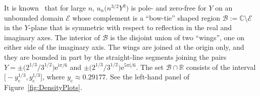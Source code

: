 It is known~\cite[Theorem 3]{BuckinghamM22} that for large $n$, $u_n\bigl(n^{3/2}Y^3\bigr)$ is pole- and zero-free for $Y$ on an unbounded domain $\mathcal{E}$ whose complement is a ``bow-tie'' shaped region $\mathcal{B}:=\mathbb{C}\setminus\mathcal{E}$ in the $Y$-plane that is symmetric with respect to reflection in the real and imaginary axes. The interior of $\mathcal{B}$ is the disjoint union of two ``wings'', one on either side of the imaginary axis. The wings are joined at the origin only, and they are bounded in part by the straight-line segments joining the pairs $Y=\pm \bigl(2^{1/3}/3^{1/2}\bigr)\mathrm{e}^{\mathrm{i}\pi/6}$ and $\pm \bigl(2^{1/3}/3^{1/2}\bigr)\mathrm{e}^{5\pi\mathrm{i}/6}$. The set $\mathcal{B}\cap\mathbb{R}$ consists of the interval $\bigl[-y_\mathrm{c}^{1/3},y_\mathrm{c}^{1/3}\bigr]$, where $y_\mathrm{c}\approx 0.29177$. See the left-hand panel of Figure~\ref{fig:DensityPlots}.

